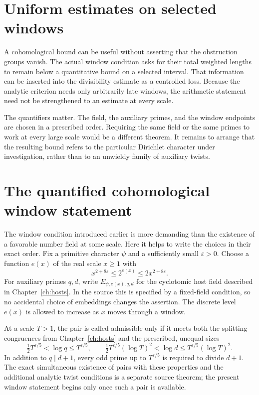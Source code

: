 \documentclass[11pt,openany,oneside]{scrbook}
\theoremstyle{definition}
\theoremstyle{remark}
\newcommand{\eps}{\varepsilon}
\begin{document}
\section{Uniform estimates on selected windows}
A cohomological bound can be useful without asserting that the obstruction groups vanish. The actual window condition asks for their total weighted lengths to remain below a quantitative bound on a selected interval. That information can be inserted into the divisibility estimate as a controlled loss. Because the analytic criterion needs only arbitrarily late windows, the arithmetic statement need not be strengthened to an estimate at every scale.

The quantifiers matter. The field, the auxiliary primes, and the window endpoints are chosen in a prescribed order. Requiring the same field or the same primes to work at every large scale would be a different theorem. It remains to arrange that the resulting bound refers to the particular Dirichlet character under investigation, rather than to an unwieldy family of auxiliary twists.

\section{The quantified cohomological window statement}\label{sec:exact-window}

The window condition introduced earlier is more demanding than the existence of a favorable number field at some scale.  Here it helps to write the choices in their exact order.  Fix a primitive character $\psi$ and a sufficiently small $\eps>0$.  Choose a function $e(x)$ of the real scale $x\ge1$ with
\begin{equation}\label{eq:window-selector}
x^{2+8\eps}\le2^{e(x)}\le2x^{2+8\eps}.
\end{equation}
For auxiliary primes $q,d$, write $E_{\psi,e(x),q,d}$ for the cyclotomic host field described in Chapter~\ref{ch:hosts}.  In the source this is specified by a fixed-field condition, so no accidental choice of embeddings changes the assertion.  The discrete level $e(x)$ is allowed to increase as $x$ moves through a window.

At a scale $T>1$, the pair is called admissible only if it meets both the splitting congruences from Chapter~\ref{ch:hosts} and the prescribed, unequal sizes
\begin{equation}\label{eq:admissible-prime-sizes}
\tfrac12T^{\eps/5}<\log q\le T^{\eps/5},\qquad
\tfrac12T^{\eps/5}(\log T)^2<\log d\le T^{\eps/5}(\log T)^2.
\end{equation}
In addition to $q\mid d+1$, every odd prime up to $T^{\eps/5}$ is required to divide $d+1$.  The exact simultaneous existence of pairs with these properties and the additional analytic twist conditions is a separate source theorem; the present window statement begins only once such a pair is available.
\end{document}
